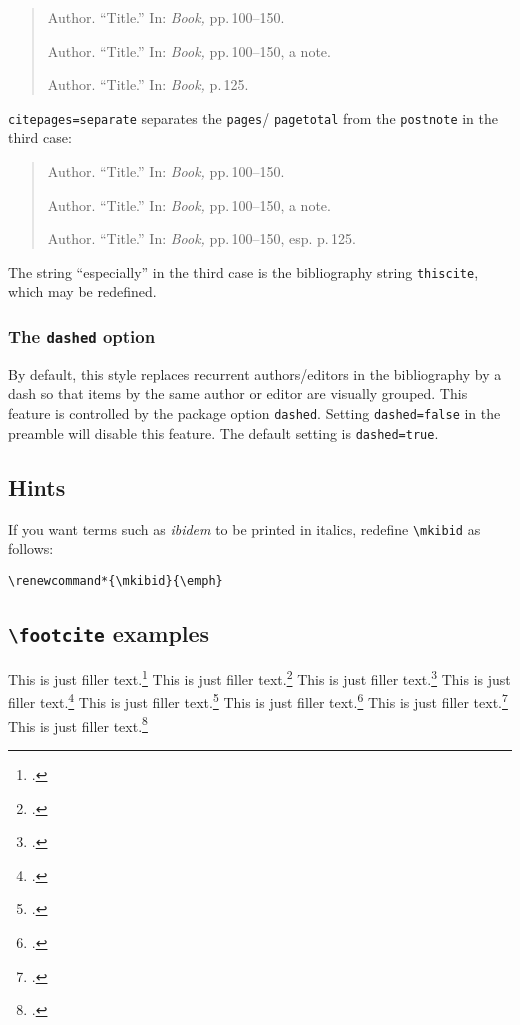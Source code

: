 \documentclass[a4paper]{article}
\newcommand{\cmd}[1]{\texttt{\textbackslash #1}}
\begin{document}
\begin{quote}
Author. \enquote{Title.} In: \emph{Book,} pp.\,100--150.

Author. \enquote{Title.} In: \emph{Book,} pp.\,100--150, a note.

Author. \enquote{Title.} In: \emph{Book,} p.\,125.
\end{quote}
%
\texttt{citepages=separate} separates the \texttt{pages}\slash
\texttt{pagetotal} from the \texttt{postnote} in the third case:

\begin{quote}
Author. \enquote{Title.} In: \emph{Book,} pp.\,100--150.

Author. \enquote{Title.} In: \emph{Book,} pp.\,100--150, a note.

Author. \enquote{Title.} In: \emph{Book,} pp.\,100--150, esp. p.\,125.
\end{quote}
%
The string \enquote{especially} in the third case is the bibliography
string \texttt{thiscite}, which may be redefined.

\subsubsection*{The \texttt{dashed} option}

By default, this style replaces recurrent authors/editors in the
bibliography by a dash so that items by the same author or editor
are visually grouped. This feature is controlled by the package
option \texttt{dashed}. Setting \texttt{dashed=false} in the
preamble will disable this feature. The default setting is
\texttt{dashed=true}.

\subsection*{Hints}

If you want terms such as \emph{ibidem} to be printed in italics,
redefine \cmd{mkibid} as follows:

\begin{verbatim}
\renewcommand*{\mkibid}{\emph}
\end{verbatim}

\clearpage

\subsection*{\cmd{footcite} examples}

This is just filler text.\footcite{aristotle:anima}
This is just filler text.\footcite{averroes/bland}
This is just filler text.\footcite[26]{aristotle:anima}
This is just filler text.\footcite[59--61]{averroes/bland}
This is just filler text.\footcite{aristotle:anima}
This is just filler text.\footcite{aristotle:anima}
This is just filler text.\footcite[25]{aristotle:anima}
This is just filler text.\footcite[25]{aristotle:anima}
\end{document}
